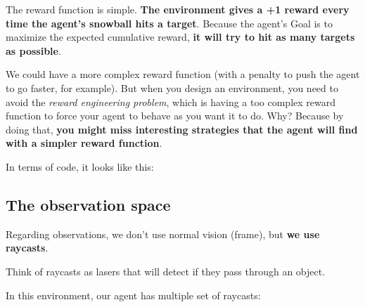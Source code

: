 \documentclass[11pt,a4paper]{article}
\begin{document}
The reward function is simple. \textbf{The environment gives a +1 reward every time the agent's snowball hits a target}. Because the agent's Goal is to maximize the expected cumulative reward, \textbf{it will try to hit as many targets as possible}.


We could have a more complex reward function (with a penalty to push the agent to go faster, for example). But when you design an environment, you need to avoid the \emph{reward engineering problem}, which is having a too complex reward function to force your agent to behave as you want it to do. Why? Because by doing that, \textbf{you might miss interesting strategies that the agent will find with a simpler reward function}.

In terms of code, it looks like this:


\subsection{The observation space}\label{the-observation-space}

Regarding observations, we don't use normal vision (frame), but \textbf{we use raycasts}.

Think of raycasts as lasers that will detect if they pass through an object.


In this environment, our agent has multiple set of raycasts:

\end{document}
